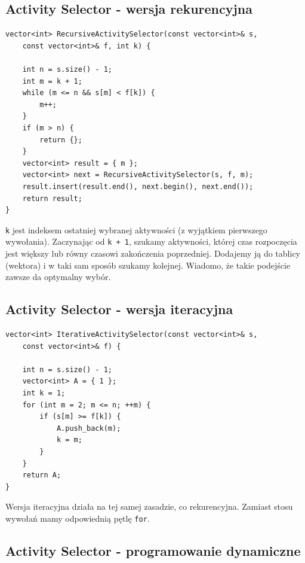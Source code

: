 \documentclass{article}
\begin{document}
\subsection{Activity Selector - wersja rekurencyjna}

\begin{verbatim}
vector<int> RecursiveActivitySelector(const vector<int>& s, 
    const vector<int>& f, int k) {
    
    int n = s.size() - 1;
    int m = k + 1;
    while (m <= n && s[m] < f[k]) {
        m++;
    }
    if (m > n) {
        return {};
    }
    vector<int> result = { m };
    vector<int> next = RecursiveActivitySelector(s, f, m);
    result.insert(result.end(), next.begin(), next.end());
    return result;
}
\end{verbatim}

\texttt{k} jest indeksem ostatniej wybranej aktywności (z wyjątkiem pierwszego wywołania). Zaczynając od \texttt{k + 1}, szukamy aktywności, której czas rozpoczęcia jest większy lub równy czasowi zakończenia poprzedniej. Dodajemy ją do tablicy (wektora) i w taki sam sposób szukamy kolejnej. Wiadomo, że takie podejście zawsze da optymalny wybór.

\subsection{Activity Selector - wersja iteracyjna}

\begin{verbatim}
vector<int> IterativeActivitySelector(const vector<int>& s, 
    const vector<int>& f) {
    
    int n = s.size() - 1;
    vector<int> A = { 1 };
    int k = 1;
    for (int m = 2; m <= n; ++m) {
        if (s[m] >= f[k]) {
            A.push_back(m);
            k = m;
        }
    }
    return A;
}
\end{verbatim}

Wersja iteracyjna działa na tej samej zasadzie, co rekurencyjna. Zamiast stosu wywołań mamy odpowiednią pętlę \texttt{for}.

\subsection{Activity Selector - programowanie dynamiczne}
\end{document}
